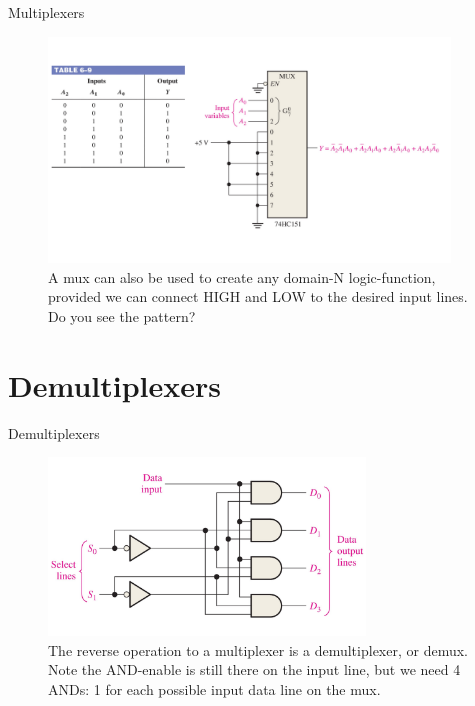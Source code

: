 \documentclass{beamer}
\begin{document}
\begin{frame}{Multiplexers}
\begin{figure}
\centering
\includegraphics[width=0.95\textwidth,trim=2cm 2cm 0cm 2cm,clip=true]{figures/mux8.pdf}
\caption{\label{fig:mux8} A mux can also be used to create any domain-N logic-function, provided we can connect HIGH and LOW to the desired input lines.  Do you see the pattern?}
\end{figure}
\end{frame}

\section{Demultiplexers}

\begin{frame}{Demultiplexers}
\begin{figure}
\centering
\includegraphics[width=0.75\textwidth,trim=0cm 0cm 3cm 0cm,clip=true]{figures/dmux1.pdf}
\caption{\label{fig:dmux1} The reverse operation to a multiplexer is a demultiplexer, or demux.  Note the AND-enable is still there on the input line, but we need 4 ANDs: 1 for each possible input data line on the mux.}
\end{figure}
\end{frame}
\end{document}
